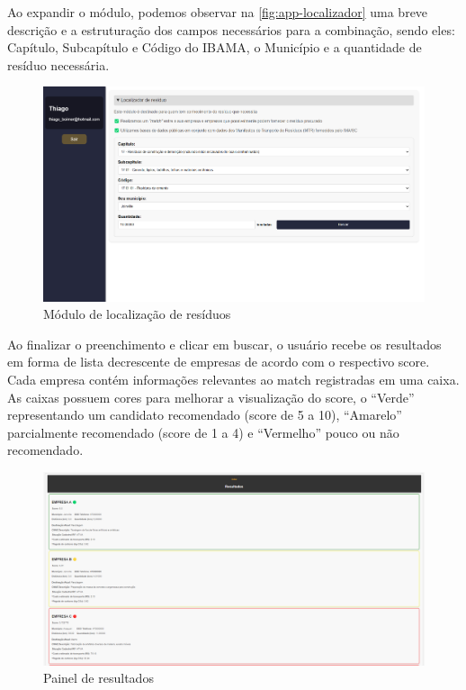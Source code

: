 Ao expandir o módulo, podemos observar na \autoref{fig:app-localizador} uma breve descrição e a estruturação dos campos necessários para a combinação, sendo eles: Capítulo, Subcapítulo e Código do \gls{IBAMA}, o Município e a quantidade de resíduo necessária.

\begin{figure}[H]
	\caption{\label{fig:app-localizador} Módulo de localização de resíduos}
	\begin{center}
		\includegraphics[scale=0.38]{images/localizador-residuo.png}
	\end{center}
\end{figure}

Ao finalizar o preenchimento e clicar em buscar, o usuário recebe os resultados em forma de lista decrescente de empresas de acordo com o respectivo score. Cada empresa contém informações relevantes ao match registradas em uma caixa. As caixas possuem cores para melhorar a visualização do score, o “Verde” representando um candidato recomendado (score de 5 a 10), “Amarelo” parcialmente recomendado (score de 1 a 4) e “Vermelho” pouco ou não recomendado.

\begin{figure}[H]
	\caption{\label{fig:app-resultado} Painel de resultados}
	\begin{center}
		\includegraphics[scale=0.44]{images/localizador-residuo-resultado.png}
	\end{center}
\end{figure}


